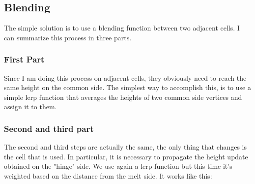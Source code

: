 \newpage

\subsection{Blending}
The simple solution is to use a blending function between two adjacent cells.
I can summarize this process in three parts.

\subsubsection{First Part}

Since I am doing this process on adjacent cells, they obviously need to reach the same height on the common side. The simplest way to accomplish this, is to use a simple lerp function that averages the heights of two common side vertices and assign it to them.

\begin{figure}[hbt!]
	\centering
	\qquad
	\caption{}
\end{figure}

\subsubsection{Second and third part}

The second and third steps are actually the same, the only thing that changes is the cell that is used. In particular, it is necessary to propagate the height update obtained on the "hinge" side. We use again a lerp function but this time it's weighted based on the distance from the melt side. It works like this:

